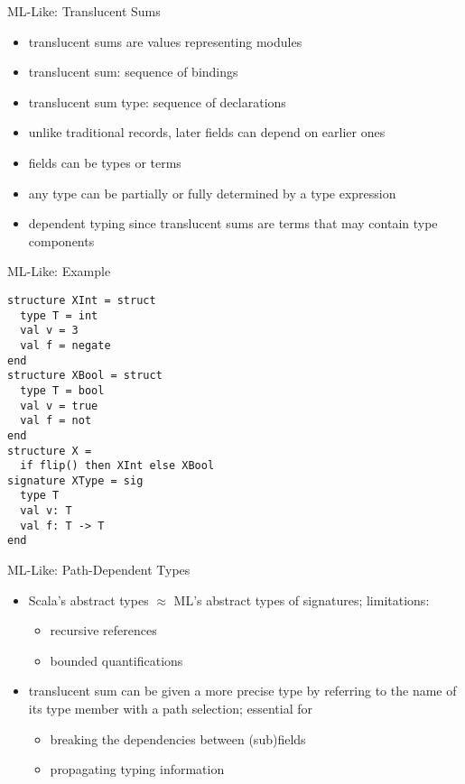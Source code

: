 \documentclass{beamer}
\begin{document}
\begin{frame}{ML-Like: Translucent Sums}
\begin{itemize}
\item translucent sums are values representing modules
\item translucent sum: sequence of bindings
\item translucent sum type: sequence of declarations
\item unlike traditional records, later fields can depend on earlier ones
\item fields can be types or terms
\item any type can be partially or fully determined by a type expression
\item dependent typing since translucent sums are terms that may contain type components
\end{itemize}
\end{frame}

\begin{frame}[fragile]{ML-Like: Example}
\begin{verbatim}
structure XInt = struct
  type T = int
  val v = 3
  val f = negate
end
structure XBool = struct
  type T = bool
  val v = true
  val f = not
end
structure X =
  if flip() then XInt else XBool
signature XType = sig
  type T
  val v: T
  val f: T -> T
end
\end{verbatim}
\end{frame}


\begin{frame}{ML-Like: Path-Dependent Types}
\begin{itemize}
\item Scala's abstract types  $\approx$ ML's abstract types of signatures; limitations:
\begin{itemize}
\item recursive references
\item bounded quantifications
\end{itemize}
\item translucent sum can be given a more precise type by referring to the name of its type member with a path selection; essential for %
\begin{itemize}
\item breaking the dependencies between (sub)fields
\item propagating typing information
\end{itemize}
\end{itemize}
\end{frame}
\end{document}

